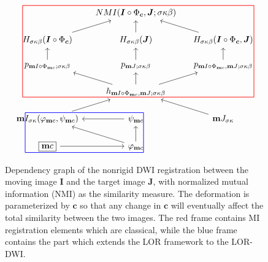 \documentclass[twocolumn]{svjour3}
\begin{document}
\begin{figure}[ht]
\begin{equation*}
\begin{tikzcd}[column sep=0.4cm,row sep=0.5cm]
  ~& NMI( \bsI\circ\Phi_{\bsc},\bsJ;\sigma\kappa\beta)&~\\
  H_{\sigma\kappa\beta}(\bsI\circ\Phi_{\bsc}) \ar[ur]&  
  H_{\sigma\kappa\beta}(\bsJ)\ar[u] & 
  H_{\sigma\kappa\beta}(\bsI\circ\Phi_{\bsc}, \bsJ)\ar[lu]\\
  p_{\bm I\circ\Phi_{\bm c};\sigma\kappa\beta}\ar[u]  & 
  p_{\bm J;\sigma\kappa\beta}\ar[u]  & 
  p_{\bm I\circ\Phi_{\bm c}, \bm J;\sigma\kappa\beta}\ar[u]\\
  ~ & h_{\bm I\circ\Phi_{\bm c},\bm J;\sigma\kappa\beta}\ar[ul]\ar[u]\ar[ur]& ~\\
  \bm I_{\sigma\kappa}(\phi_{\bm c},\psi_{\bm c})\ar[ur]&\psi_{\bm c}\ar[l]&\bm J_{\sigma\kappa}\ar[ul]\\
  \boxed{\bm c}\ar[r ]& \phi_{\bm c}\ar[lu] \ar[u]&
  \ar[from=1-1,to=1-3,color=red,dash,line width=0.65pt,start
  anchor={[xshift=-2.9em,yshift=2ex]center},end
  anchor={[xshift=+3.6em,yshift=2ex]center}]
  \ar[from=1-1,to=4-1,color=red,dash,line width=0.65pt,start
  anchor={[xshift=-2.9em,yshift=2ex]center},end
  anchor={[xshift=-2.9em,yshift=-1.5ex]center}]
  \ar[from=4-1,to=4-3,color=red,dash,line width=0.65pt,start
  anchor={[xshift=-2.9em,yshift=-1.5ex]center},end
  anchor={[xshift=+3.6em,yshift=-1.5ex]center}]
  \ar[from=1-3,to=4-3,color=red,dash,line width=0.65pt,start
  anchor={[xshift=+3.6em,yshift=2ex]center},end
  anchor={[xshift=+3.6em,yshift=-1.5ex]center}]
  \ar[from=5-1,to=5-2,color=blue,dash,line width=0.65pt,start
  anchor={[xshift=-2.6em,yshift=1.7ex]center},end
  anchor={[xshift=+0.9em,yshift=1.7ex]center}]
  \ar[from=6-1,to=6-2,color=blue,dash,line width=0.65pt,start
  anchor={[xshift=-2.6em,yshift=-1.7ex]center},end
  anchor={[xshift=+0.9em,yshift=-1.7ex]center}]
  \ar[from=5-1,to=6-1,color=blue,dash,line width=0.65pt,start
  anchor={[xshift=-2.6em,yshift=1.7ex]center},end
  anchor={[xshift=-2.6em,yshift=-1.7ex]center}]
  \ar[from=5-2,to=6-2,color=blue,dash,line width=0.65pt,start
  anchor={[xshift=+0.9em,yshift=1.7ex]center},end
  anchor={[xshift=+0.9em,yshift=-1.7ex]center}]
\end{tikzcd}
\end{equation*}
\caption{Dependency graph of the nonrigid DWI registration between the moving image
  $\bm I$ and the target image $\bm J$, with normalized mutual information (NMI) as the
  similarity measure. The deformation is parameterized by $\bm c$ so that any change in
  $\bm c$ will eventually affect the total similarity between the two images. The red
  frame contains MI registration elements which are classical, while the blue frame
  contains the part which extends the LOR framework to the LOR-DWI.}
    \label{fig:dependcygraph}
\end{figure}
\end{document}
